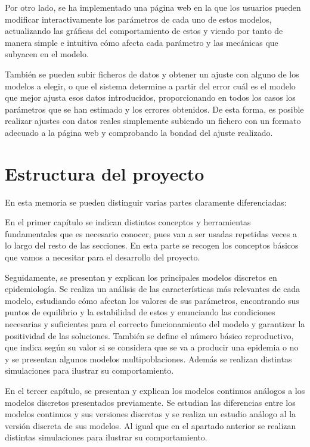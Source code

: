 Por otro lado, se ha implementado una página web en la que los usuarios pueden modificar interactivamente los parámetros de cada uno de estos modelos, actualizando las gráficas del comportamiento de estos y viendo por tanto de manera simple e intuitiva cómo afecta cada parámetro y las mecánicas que subyacen en el modelo.

También se pueden subir ficheros de datos y obtener un ajuste con alguno de los modelos a elegir, o que el sistema determine a partir del error cuál es el modelo que mejor ajusta esos datos introducidos, proporcionando en todos los casos los parámetros que se han estimado y los errores obtenidos. De esta forma, es posible realizar ajustes con datos reales simplemente subiendo un fichero con un formato adecuado a la página web y comprobando la bondad del ajuste realizado.


\section*{Estructura del proyecto}

En esta memoria se pueden distinguir varias partes claramente diferenciadas:

En el primer capítulo se indican distintos conceptos y herramientas fundamentales que es necesario conocer, pues van a ser usadas repetidas veces a lo largo del resto de las secciones. En esta parte se recogen los conceptos básicos que vamos a necesitar para el desarrollo del proyecto.

Seguidamente, se presentan y explican los principales modelos discretos en epidemiología. Se realiza un análisis de las características más relevantes de cada modelo, estudiando cómo afectan los valores de sus parámetros, encontrando sus puntos de equilibrio y la estabilidad de estos y enunciando las condiciones necesarias y suficientes para el correcto funcionamiento del modelo y garantizar la positividad de las soluciones. También se define el número básico reproductivo, que indica según su valor si se considera que se va a producir una epidemia o no y se presentan algunos modelos multipoblaciones. Además se realizan distintas simulaciones para ilustrar su comportamiento. 

En el tercer capítulo, se presentan y explican los modelos continuos análogos a los modelos discretos presentados previamente. Se estudian las diferencias entre los modelos continuos y sus versiones discretas y se realiza un estudio análogo al la versión discreta de sus modelos. Al igual que en el apartado anterior se realizan distintas simulaciones para ilustrar su comportamiento.


